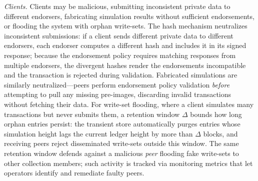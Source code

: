 \textit{Clients.} Clients may be malicious, submitting inconsistent private data to different endorsers, fabricating simulation results without sufficient endorsements, or flooding the system with orphan write-sets. The hash mechanism neutralizes inconsistent submissions: if a client sends different private data to different endorsers, each endorser computes a different hash and includes it in its signed response; because the endorsement policy requires matching responses from multiple endorsers, the divergent hashes render the endorsements incompatible and the transaction is rejected during validation. Fabricated simulations are similarly neutralized---peers perform endorsement policy validation \textit{before} attempting to pull any missing pre-images, discarding invalid transactions without fetching their data. For write-set flooding, where a client simulates many transactions but never submits them, a retention window $\Delta$ bounds how long orphan entries persist: the transient store automatically purges entries whose simulation height lags the current ledger height by more than $\Delta$ blocks, and receiving peers reject disseminated write-sets outside this window. The same retention window defends against a malicious \textit{peer} flooding fake write-sets to other collection members; such activity is tracked via monitoring metrics that let operators identify and remediate faulty peers.

